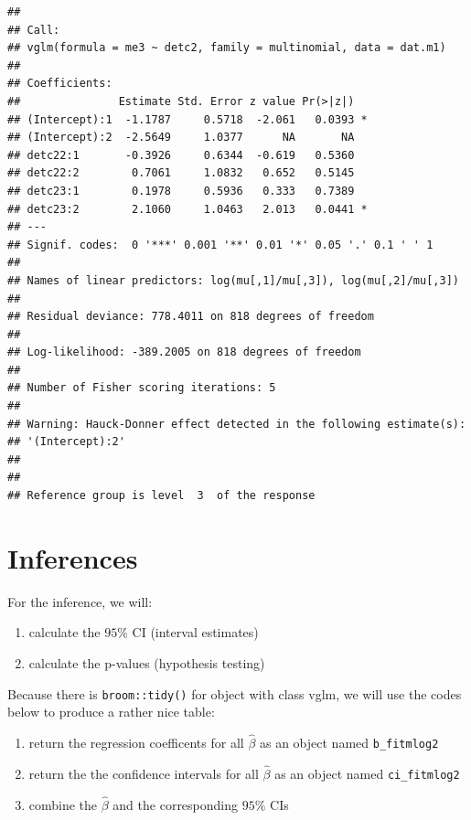 \documentclass[
  10pt,
]{krantz}
\providecommand{\tightlist}{%
  \setlength{\itemsep}{0pt}\setlength{\parskip}{0pt}}
\begin{document}
\begin{verbatim}
## 
## Call:
## vglm(formula = me3 ~ detc2, family = multinomial, data = dat.m1)
## 
## Coefficients: 
##               Estimate Std. Error z value Pr(>|z|)  
## (Intercept):1  -1.1787     0.5718  -2.061   0.0393 *
## (Intercept):2  -2.5649     1.0377      NA       NA  
## detc22:1       -0.3926     0.6344  -0.619   0.5360  
## detc22:2        0.7061     1.0832   0.652   0.5145  
## detc23:1        0.1978     0.5936   0.333   0.7389  
## detc23:2        2.1060     1.0463   2.013   0.0441 *
## ---
## Signif. codes:  0 '***' 0.001 '**' 0.01 '*' 0.05 '.' 0.1 ' ' 1
## 
## Names of linear predictors: log(mu[,1]/mu[,3]), log(mu[,2]/mu[,3])
## 
## Residual deviance: 778.4011 on 818 degrees of freedom
## 
## Log-likelihood: -389.2005 on 818 degrees of freedom
## 
## Number of Fisher scoring iterations: 5 
## 
## Warning: Hauck-Donner effect detected in the following estimate(s):
## '(Intercept):2'
## 
## 
## Reference group is level  3  of the response
\end{verbatim}

\hypertarget{inferences}{%
\section{Inferences}\label{inferences}}

For the inference, we will:

\begin{enumerate}
\def\labelenumi{\arabic{enumi}.}
\tightlist
\item
  calculate the \(95\%\) CI (interval estimates)
\item
  calculate the p-values (hypothesis testing)
\end{enumerate}

Because there is \texttt{broom::tidy()} for object with class vglm, we will use the codes below to produce a rather nice table:

\begin{enumerate}
\def\labelenumi{\arabic{enumi}.}
\tightlist
\item
  return the regression coefficents for all \(\hat\beta\) as an object named \texttt{b\_fitmlog2}
\item
  return the the confidence intervals for all \(\hat\beta\) as an object named \texttt{ci\_fitmlog2}
\item
  combine the \(\hat\beta\) and the corresponding \(95\%\) CIs
\end{enumerate}
\end{document}
